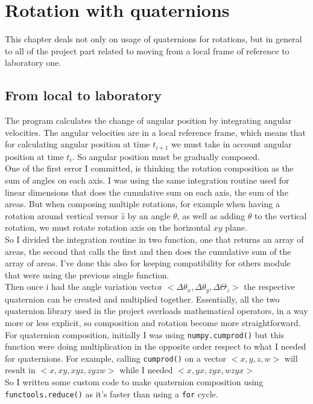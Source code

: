\chapter{Rotation with quaternions}
\label{chap:rotation_with_quaternions}

This chapter deals not only on usage of quaternions for rotations, but in general to all of the project part related to moving from a local frame of reference to laboratory one.

\section{From local to laboratory}
The program calculates the change of angular position by integrating angular velocities. The angular velocities are in a local reference frame, which means that for calculating angular position at time $t_{i+1}$ we must take in account angular position at time $t_i$. So angular position must be gradually composed.\\
One of the first error I committed, is thinking the rotation composition as the sum of angles on each axis. I was using the same integration routine used for linear dimensions that does the cumulative sum on each axis, the sum of the areas. But when composing multiple rotations, for example when having a rotation around vertical versor $\hat{z}$ by an angle $\theta$, as well as adding $\theta$ to the vertical rotation, we must rotate rotation axis on the horizontal $xy$ plane. \\
So I divided the integration routine in two function, one that returns an array of areas, the second that calls the first and then does the cumulative sum of the array of areas. I've done this also for keeping compatibility for others module that were using the previous single function. \\
Then once i had the angle variation vector $<\Delta\theta_x,\Delta\theta_y,\Delta\Theta_z>$ the respective quaternion can be created and multiplied together. 
Essentially, all the two quaternion library used in the project overloads mathematical operators, in a way more or less explicit, so composition and rotation become more straightforward. \\
For quaternion composition, initially I was using \texttt{numpy.cumprod()} \cite{numpy-cumprod} but this function were doing multiplication in the opposite order respect to what I needed for quaternions. For example, calling \texttt{cumprod()} on a vector $<x,y,z,w>$ will result in $<x,xy,xyz,zyzw>$ while I needed 
$<x,yx,zyx,wzyx>$ \\
So I written some custom code to make quaternion composition using \texttt{functools.reduce()} as it's faster than using a \texttt{for} cycle.

